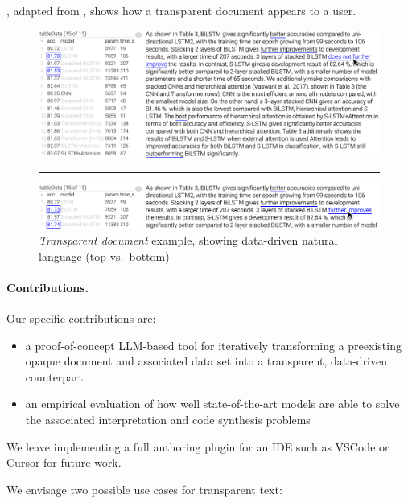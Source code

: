 , adapted from \cite{zhang18}, shows how a transparent document appears to a
user. 

\begin{figure}%
    \centering
    \includegraphics[width=\linewidth]{fig/scigen-1805.02474v1-10-with-pointer.png}
    \vspace{1mm}
    \hrule
    \includegraphics[width=\linewidth]{fig/scigen-1805.02474v1-10-counterfactual-with-pointer.png}
    \caption{\emph{Transparent document} example, showing data-driven natural language (top
    vs.~bottom)}
    \label{fig:scigen-example-website}
\end{figure}

\paragraph{Contributions.} Our specific contributions are:

\begin{itemize}
\item a proof-of-concept LLM-based tool for iteratively transforming a preexisting opaque document and
associated data set into a transparent, data-driven counterpart
\item an empirical evaluation of how well state-of-the-art models are able to solve the associated
interpretation and code synthesis problems
\end{itemize}

We leave implementing a full authoring plugin for an IDE such as VSCode or Cursor for future work.

We envisage two possible use cases for transparent text:

